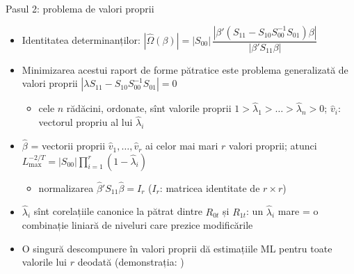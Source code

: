 \begin{frame}{Pasul 2: problema de valori proprii}
\itemsize{\small}
\begin{itemize}
    \item Identitatea determinanților: $|\hat\Omega(\beta)| = |S_{00}|\,\dfrac{|\beta'(S_{11} - S_{10}S_{00}^{-1}S_{01})\beta|}{|\beta'S_{11}\beta|}$
    \item Minimizarea acestui raport de forme pătratice este problema generalizată de valori proprii $|\lambda S_{11} - S_{10}S_{00}^{-1}S_{01}| = 0$
    \begin{itemize}
        \item cele $n$ rădăcini, ordonate, sînt valorile proprii $1 > \hat\lambda_1 > \dots > \hat\lambda_n > 0$; $\hat v_i$: vectorul propriu al lui $\hat\lambda_i$
    \end{itemize}
    \item $\hat\beta$ = vectorii proprii $\hat v_1, \dots, \hat v_r$ ai celor mai mari $r$ valori proprii; atunci $L_{\max}^{-2/T} = |S_{00}|\prod_{i=1}^r(1 - \hat\lambda_i)$
    \begin{itemize}
        \item normalizarea $\hat\beta'S_{11}\hat\beta = I_r$ ($I_r$: matricea identitate de $r\times r$)
    \end{itemize}
    \item $\hat\lambda_i$ sînt corelațiile canonice la pătrat dintre $R_{0t}$ și $R_{1t}$: un $\hat\lambda_i$ mare = o combinație liniară de niveluri care prezice modificările
    \item O singură descompunere în valori proprii dă estimațiile ML pentru toate valorile lui $r$ deodată (demonstrația: )
\end{itemize}
\end{frame}

